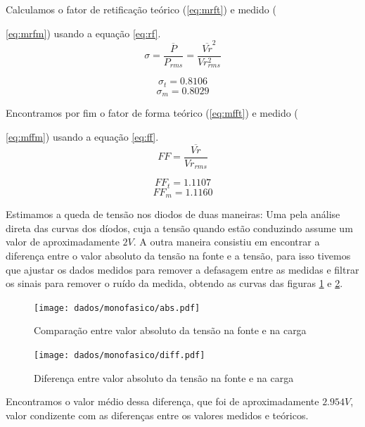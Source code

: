 \documentclass{report}
\begin{document}
Calculamos o fator de retificação teórico (\ref{eq:mrft}) e medido ({\ref{eq:mrfm}) usando a equação \ref{eq:rf}.
\begin{equation}
	\sigma = \frac{\overline{P}}{P_{rms}} = \frac{\overline{Vr}^2}{Vr_{rms}^2}
	\label{eq:rf}
\end{equation}

\begin{equation}
	\sigma_t = 0.8106
	\label{eq:mrft}
\end{equation}
\begin{equation}
	\sigma_m = 0.8029
	\label{eq:mrfm}
\end{equation}

Encontramos por fim o fator de forma teórico (\ref{eq:mfft}) e medido ({\ref{eq:mffm}) usando a equação \ref{eq:ff}.
\begin{equation}
FF = \frac{\overline{Vr}}{Vr_{rms}}
\label{eq:ff}
\end{equation}

\begin{equation}
FF_t = 1.1107
\label{eq:mfft}
\end{equation}
\begin{equation}
FF_m = 1.1160
\label{eq:mffm}
\end{equation}

Estimamos a queda de tensão nos diodos de duas maneiras: Uma pela análise direta das curvas dos díodos, cuja a tensão quando estão conduzindo assume um valor de aproximadamente $2 V$. A outra maneira consistiu em encontrar a diferença entre o valor absoluto da tensão na fonte e a tensão, para isso tivemos que ajustar os dados medidos para remover a defasagem entre as medidas e filtrar os sinais para remover o ruído da medida, obtendo as curvas das figuras \ref{fig:abs} e \ref{fig:diff}.

\begin{figure}[H]
	\centering
	\texttt{[image: dados/monofasico/abs.pdf]}
	\caption{Comparação entre valor absoluto da tensão na fonte e na carga}
	\label{fig:abs}
\end{figure}

\begin{figure}[H]
	\centering
	\texttt{[image: dados/monofasico/diff.pdf]}
	\caption{Diferença entre valor absoluto da tensão na fonte e na carga}
	\label{fig:diff}
\end{figure}

Encontramos o valor médio dessa diferença, que foi de aproximadamente $2.954 V$, valor condizente com as diferenças entre os valores medidos e teóricos.

}}
\end{document}
